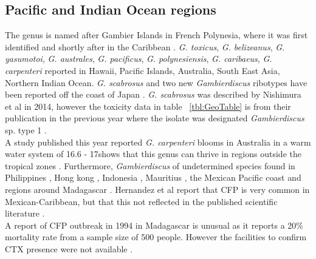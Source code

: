 \documentclass[12pt]{article}
\begin{document}
\subsection{Pacific and Indian Ocean regions}
The genus is named after Gambier Islands in French Polynesia, where it was first identified \cite{adachi1979thecal} and shortly after in the Caribbean \cite{besada1982observations}.
\emph{G. toxicus}, \emph{G. belizeanus}, \emph{G. yasumotoi}, \emph{G. australes}, \emph{G. pacificus}, \emph{G. polynesiensis}, \emph{G. caribaeus}, \emph{G. carpenteri} reported in Hawaii, Pacific Islands, Australia, South East Asia, Northern Indian Ocean.
\emph{G. scabrosus} and two new \emph{Gambierdiscus} ribotypes have been reported off the coast of Japan \cite{nishimura2013genetic,nishimura2014morphology}. \emph{G. scabrosus} was described by Nishimura et al in 2014, however the toxicity data in table ~\ref{tbl:GeoTable} is from their publication in the previous year where the isolate was designated \emph{Gambierdiscus} sp. type 1 \cite{nishimura2013genetic,nishimura2014morphology}. \\
A study published this year reported \emph{G. carpenteri} blooms in Australia in a warm water system of 16.6 - 17\celsius shows that this genus can thrive in regions outside the tropical zones \cite{kohli2014high}.
Furthermore, \emph{Gambierdiscus} of undetermined species found in Philippines \cite{gillespie1987possible}, Hong kong \cite{lu2004harmful}, Indonesia \cite{praseno1996hab}, Mauritius \cite{hurbungs2002seasonal}, the Mexican Pacific coast \cite{ceballos2006analisis} and regions around Madagascar \cite{grzebyk1994ecology}. Hernandez et al report that CFP is very common in Mexican-Caribbean, but that this not reflected in the published scientific literature \cite{hernandez2004species}.\\
A report of CFP outbreak in 1994 in Madagascar is unusual as it reports a 20\% mortality rate from a sample size of 500 people. However the facilities to confirm CTX presence were not available \cite{habermehl1994severe}. 
\end{document}
